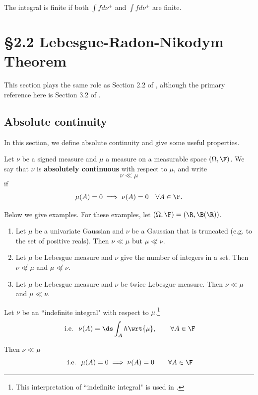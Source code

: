 \documentclass{article} %
\newif\ifActive
\newcommand{\dmu}{\wrt{\mu}}
\begin{document}
The integral is finite if both $\int f d\nu^+$ and $\int f d\nu^+$ are finite. 




\section{\S 2.2 Lebesgue-Radon-Nikodym Theorem}

This section plays the same role as Section 2.2 of \cite{ash2000probability}, although the primary reference here is Section 3.2 of \cite{folland1999real}.

\subsection{Absolute continuity} \label{sec:absolute_continuity}

In this section, we define absolute continuity and give some useful properties.

\begin{definition}
Let $\nu$ be a signed measure and $\mu$ a measure on a measurable space $(\Omega, \F)$.  We say that $\nu$ is \textbf{absolutely continuous} with respect to $\mu$, and write
\[ \nu \ll \mu \]
if 
\[ \mu(A) = 0 \implies \nu(A) = 0 \quad \forall A \in \F. \]
\label{def:absolute_continuity}	
\end{definition}

\begin{example}

Below we give examples.  For these examples, let $(\Omega, \F) = (\R, \B(\R))$.

\ifActive
\textbf{Workshop Discussion:} Can you think of any examples?
\else 
	\begin{enumerate}
	\item Let $\mu$ be a univariate Gaussian and $\nu$ be a Gaussian that is truncated (e.g. to the set of positive reals).  Then $\nu \ll \mu$ but $\mu \not\ll \nu$.
	\item Let $\mu$ be Lebesgue measure and $\nu$ give the number of integers in a set.  Then $\nu \not\ll \mu$ and $\mu \not\ll \nu$.
	\item Let $\mu$ be Lebesgue measure and $\nu$ be twice Lebesgue measure.  Then $\nu \ll \mu$ and $\mu \ll \nu$.
	\end{enumerate}
\fi 
\label{ex:examples_with_absolute_continuity}
\end{example}


\begin{remark}{}

Let $\nu$ be an ``indefinite integral" with respect to $\mu$.\footnote{This interpretation of ``indefinite integral" is used in \cite[pp.~61]{ash2000probability}.}
\[ \text{ i.e. } \; \nu(A) = \ds\int_A h \dmu, \quad \quad \forall A \in \F \]

Then $\nu \ll \mu$
\[ \text{ i.e. } \; \mu(A) = 0 \implies \nu(A) = 0  \quad \quad \forall A \in \F \]
\label{rk:indefinite_integrals_are_absolutely_continuous}
\end{remark}
\end{document}
